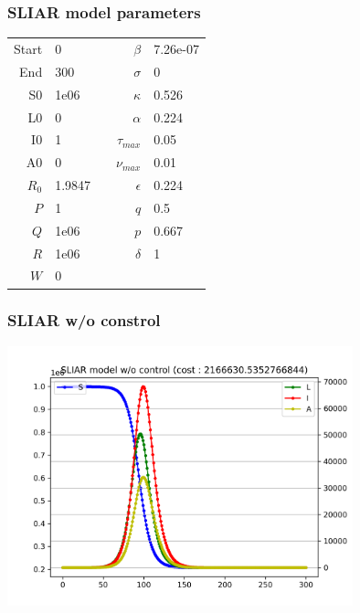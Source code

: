 \documentclass[usenames,dvipsnames, aspectratio=169, 9pt]{beamer}
\begin{document}
\begin{frame}\frametitle{SLIAR model parameters}
    \begin{table}
\centering
\begin{tabular}{rllrl}
Start & 0      & &$\beta$         & 7.26e-07  \\
End   & 300    & &$\sigma$        & 0         \\
S0    & 1e06    & &$\kappa$        & 0.526     \\
L0    & 0      & &$\alpha$        & 0.224     \\
I0    & 1      & &$\tau_{max}$ & 0.05      \\
A0    & 0      & &$\nu_{max}$  & 0.01 \\
$R_0$  & 1.9847 & &$\epsilon$      & 0.224     \\
$P$ & 1      & &$q$                            & 0.5       \\
$Q$ & 1e06    & &$p$        & 0.667         \\
$R$ & 1e06    & &$\delta$        & 1   \\
$W$ & 0   &     &                             &          
\end{tabular}
\end{table}
\end{frame}


\begin{frame}\frametitle{SLIAR w/o constrol}
    \centering
    \includegraphics[width=10cm]{figure/sliar_wo_control.png}
\end{frame}
\end{document}
